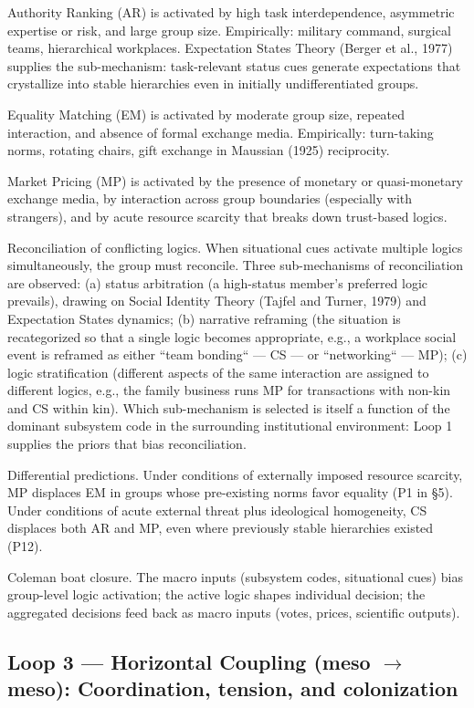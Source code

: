 \documentclass[12pt,a4paper]{article}
\begin{document}
Authority Ranking (AR) is activated by high task interdependence, asymmetric expertise or risk, and large group size. Empirically: military command, surgical teams, hierarchical workplaces. Expectation States Theory (Berger et al., 1977) supplies the sub-mechanism: task-relevant status cues generate expectations that crystallize into stable hierarchies even in initially undifferentiated groups.

Equality Matching (EM) is activated by moderate group size, repeated interaction, and absence of formal exchange media. Empirically: turn-taking norms, rotating chairs, gift exchange in Maussian (1925) reciprocity.

Market Pricing (MP) is activated by the presence of monetary or quasi-monetary exchange media, by interaction across group boundaries (especially with strangers), and by acute resource scarcity that breaks down trust-based logics.


Reconciliation of conflicting logics. When situational cues activate multiple logics simultaneously, the group must reconcile. Three sub-mechanisms of reconciliation are observed: (a) status arbitration (a high-status member's preferred logic prevails), drawing on Social Identity Theory (Tajfel and Turner, 1979) and Expectation States dynamics; (b) narrative reframing (the situation is recategorized so that a single logic becomes appropriate, e.g., a workplace social event is reframed as either ``team bonding`` --- CS --- or ``networking`` --- MP); (c) logic stratification (different aspects of the same interaction are assigned to different logics, e.g., the family business runs MP for transactions with non-kin and CS within kin). Which sub-mechanism is selected is itself a function of the dominant subsystem code in the surrounding institutional environment: Loop 1 supplies the priors that bias reconciliation.


Differential predictions. Under conditions of externally imposed resource scarcity, MP displaces EM in groups whose pre-existing norms favor equality (P1 in §5). Under conditions of acute external threat plus ideological homogeneity, CS displaces both AR and MP, even where previously stable hierarchies existed (P12).


Coleman boat closure. The macro inputs (subsystem codes, situational cues) bias group-level logic activation; the active logic shapes individual decision; the aggregated decisions feed back as macro inputs (votes, prices, scientific outputs).

\subsection{Loop 3 --- Horizontal Coupling (meso $\rightarrow$ meso): Coordination, tension, and colonization}
\end{document}
